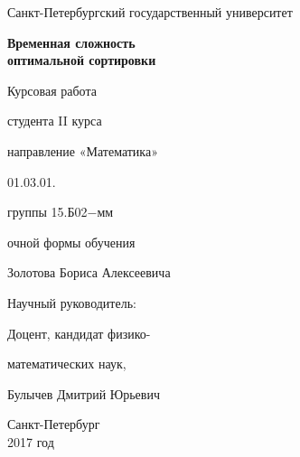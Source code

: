 \thispagestyle{firstst}
\centerline{\large Санкт-Петербургский государственный университет}

\vspace{6cm}

\begin{center}
	\bf\LARGE
	Временная сложность \\ оптимальной сортировки
\end{center}

\vspace{0.9cm}

{\parindent=8cm \large
	Курсовая работа \par
	студента II курса \par
	направление «Математика» \par
	01.03.01. \par
	группы 15.Б02$-$мм\par
	очной формы обучения \par
	Золотова Бориса Алексеевича \par}

\vspace{0.8cm}

{\parindent=8cm \large
	Научный руководитель: \par
	Доцент, кандидат физико- \par
	математических наук, \par
	Булычев Дмитрий Юрьевич \par}

\vspace{4.4cm}
\begin{center}
	\large
	Санкт-Петербург \\
	2017 год
\end{center}

\vfill\eject
